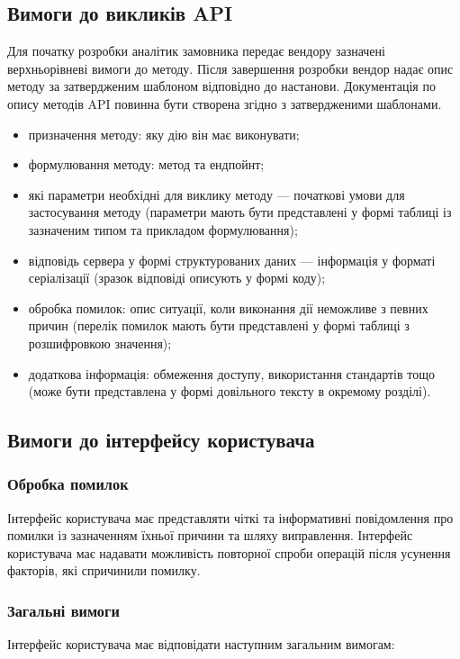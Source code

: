 \documentclass{article}
\begin{document}
\newpage
\subsection{Вимоги до викликів API}
Для початку розробки аналітик замовника передає вендору зазначені верхньорівневі вимоги до методу.
Після завершення розробки вендор надає опис методу за затвердженим шаблоном відповідно до настанови.
Документація по опису методів API повинна бути створена згідно з затвердженими шаблонами.

\begin{itemize}
    \item призначення методу: яку дію він має виконувати;
    \item формулювання методу: метод та ендпойнт;
    \item які параметри необхідні для виклику методу — початкові умови для застосування методу (параметри мають бути представлені у формі таблиці із зазначеним типом та прикладом формулювання);
    \item відповідь сервера у формі структурованих даних — інформація у форматі серіалізації (зразок відповіді описують у формі коду);
    \item обробка помилок: опис ситуації, коли виконання дії неможливе з певних причин (перелік помилок мають бути представлені у формі таблиці з розшифровкою значення);
    \item додаткова інформація: обмеження доступу, використання стандартів тощо (може бути представлена у формі довільного тексту в окремому розділі).
\end{itemize}

\subsection{Вимоги до інтерфейсу користувача}

\subsubsection{Обробка помилок}
Інтерфейс користувача має представляти чіткі та інформативні повідомлення про помилки із
зазначенням їхньої причини та шляху виправлення. Інтерфейс користувача має надавати можливість
повторної спроби операцій після усунення факторів, які спричинили помилку.

\subsubsection{Загальні вимоги}
Інтерфейс користувача має відповідати наступним загальним вимогам:
\end{document}
